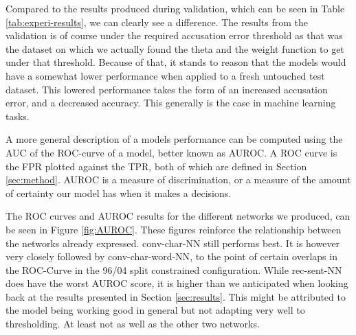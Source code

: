 Compared to the results produced during validation, which can be seen in
Table \ref{tab:experi-results}, we can clearly see a difference. The results
from the validation is of course under the required accusation error threshold
as that was the dataset on which we actually found the theta and the weight
function to get under that threshold. Because of that, it stands to reason that
the models would have a somewhat lower performance when applied to a fresh
untouched test dataset. This lowered performance takes the form of an increased
accusation error, and a decreased accuracy. This generally is the case in
machine learning tasks.

A more general description of a models performance can be computed using the
\gls{AUC} of the \gls{ROC}-curve of a model, better known as \gls{AUROC}.
A \gls{ROC} curve is the \gls{FPR} plotted against the \gls{TPR}, both of
which are defined in Section \ref{sec:method}. \gls{AUROC} is a measure of
discrimination, or a measure of the amount of certainty our model has when it
makes a decisions. 

The ROC curves and AUROC results for the different networks we produced, can
be seen in Figure \ref{fig:AUROC}. These figures reinforce the relationship
between the networks already expressed. \gls{conv-char-NN} still performs
best. It is however very closely followed by \gls{conv-char-word-NN}, to the
point of certain overlaps in the ROC-Curve in the 96/04 split constrained
configuration. While \gls{rec-sent-NN} does have the worst AUROC score, it is
higher than we anticipated when looking back at the results presented in Section
\ref{sec:results}. This might be attributed to the model being working good in
general but not adapting very well to thresholding. At least not as well as the
other two networks.

